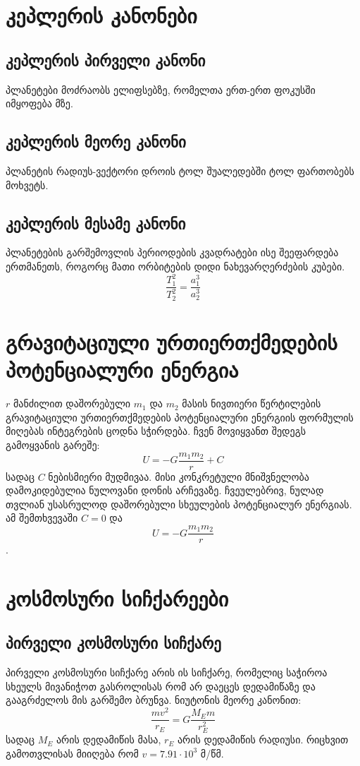 \documentclass[a4paper]{article}
\begin{document}
	\section{კეპლერის კანონები}
	\subsection{კეპლერის პირველი კანონი}
	პლანეტები მოძრაობს ელიფსებზე, რომელთა ერთ-ერთ ფოკუსში იმყოფება მზე.
	\subsection{კეპლერის მეორე კანონი}
	პლანეტის რადიუს-ვექტორი დროის ტოლ შუალედებში ტოლ ფართობებს მოხვეტს.
	\subsection{კეპლერის მესამე კანონი}
	პლანეტების გარშემოვლის პერიოდების კვადრატები ისე შეეფარდება ერთმანეთს, როგორც მათი ორბიტების დიდი ნახევარღერძების კუბები.
	\begin{equation}
		\frac{T_1^2}{T_2^2} = \frac{a_1^3}{a_2^3}
	\end{equation}
	\section{გრავიტაციული ურთიერთქმედების პოტენციალური ენერგია}
	$r$ მანძილით დაშორებული $m_1$ და $m_2$ მასის ნივთიერი წერტილების გრავიტაციული ურთიერთქმედების პოტენციალური ენერგიის ფორმულის მიღებას ინტეგრების ცოდნა სჭირდება. ჩვენ მოვიყვანთ შედეგს გამოყვანის გარეშე:
	\begin{equation}
		U = -G\frac{m_1 m_2}{r} + C
	\end{equation}
სადაც $C$ ნებისმიერი მუდმივაა. მისი კონკრეტული მნიშვნელობა დამოკიდებულია ნულოვანი დონის არჩევაზე. ჩვეულებრივ, ნულად თვლიან
უსასრულოდ დაშორებული სხეულების პოტენციალურ ენერგიას. ამ შემთხვევაში	$C = 0$ და $$U = -G\frac{m_1 m_2}{r}$$.
	
	\section{კოსმოსური სიჩქარეები}
	\subsection{პირველი კოსმოსური სიჩქარე}
		პირველი კოსმოსური სიჩქარე არის ის სიჩქარე, რომელიც საჭიროა სხეულს მივანიჭოთ გასროლისას რომ არ დაეცეს დედამიწაზე და გააგრძელოს მის გარშემო ბრუნვა. ნიუტონის მეორე კანონით:
		\begin{equation}
			\frac{mv^2}{r_E} = G\frac{M_Em}{r_E^2}
		\end{equation}
სადაც $M_E$ არის დედამიწის მასა, $r_E$ არის დედამიწის რადიუსი. რიცხვით გამოთვლისას მიიღება რომ $v = 7.91 \cdot 10^3$ მ/წმ.
\end{document}
